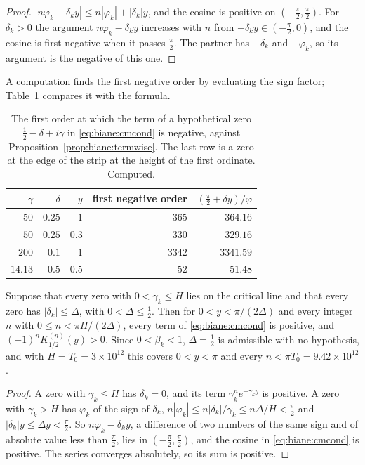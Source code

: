 \begin{proof}
$|n\varphi_k-\delta_ky|\le n|\varphi_k|+|\delta_k|y$, and the cosine is positive on $(-\frac\pi2,\frac\pi2)$. For $\delta_k>0$ the argument $n\varphi_k-\delta_ky$ increases with $n$ from $-\delta_ky\in(-\frac\pi2,0)$, and the cosine is first negative when it passes $\frac\pi2$. The partner has $-\delta_k$ and $-\varphi_k$, so its argument is the negative of this one.
\end{proof}

A computation finds the first negative order by evaluating the sign factor; Table~\ref{tab:biane:cmorders} compares it with the formula.

\begin{table}[htbp]
\centering\small
\begin{tabular}{rrrrr}
\toprule
$\gamma$ & $\delta$ & $y$ & first negative order & $(\frac\pi2+\delta y)/\varphi$\\
\midrule
$50$ & $0.25$ & $1$ & $365$ & $364.16$\\
$50$ & $0.25$ & $0.3$ & $330$ & $329.16$\\
$200$ & $0.1$ & $1$ & $3342$ & $3341.59$\\
$14.13$ & $0.5$ & $0.5$ & $52$ & $51.48$\\
\bottomrule
\end{tabular}
\caption{The first order at which the term of a hypothetical zero $\frac12-\delta+i\gamma$ in \eqref{eq:biane:cmcond} is negative, against Proposition~\ref{prop:biane:termwise}. The last row is a zero at the edge of the strip at the height of the first ordinate. Computed.}
\label{tab:biane:cmorders}
\end{table}

\begin{theorem}\label{thm:biane:cmrange}
Suppose that every zero with $0<\gamma_k\le H$ lies on the critical line and that every zero has $|\delta_k|\le\Delta$, with $0<\Delta\le\frac12$. Then for $0<y<\pi/(2\Delta)$ and every integer $n$ with $0\le n<\pi H/(2\Delta)$, every term of \eqref{eq:biane:cmcond} is positive, and $(-1)^nK_{1/2}^{(n)}(y)>0$. Since $0<\beta_k<1$, $\Delta=\frac12$ is admissible with no hypothesis, and with $H=T_0=3\times10^{12}$ \cite{PT21} this covers $0<y<\pi$ and every $n<\pi T_0=9.42\times10^{12}$.
\end{theorem}

\begin{proof}
A zero with $\gamma_k\le H$ has $\delta_k=0$, and its term $\gamma_k^ne^{-\gamma_ky}$ is positive. A zero with $\gamma_k>H$ has $\varphi_k$ of the sign of $\delta_k$, $n|\varphi_k|\le n|\delta_k|/\gamma_k\le n\Delta/H<\frac\pi2$ and $|\delta_k|y\le\Delta y<\frac\pi2$. So $n\varphi_k-\delta_ky$, a difference of two numbers of the same sign and of absolute value less than $\frac\pi2$, lies in $(-\frac\pi2,\frac\pi2)$, and the cosine in \eqref{eq:biane:cmcond} is positive. The series converges absolutely, so its sum is positive.
\end{proof}

